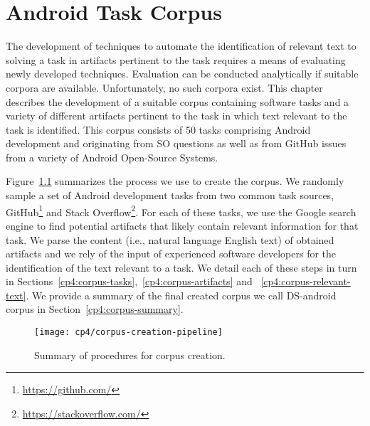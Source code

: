 \setcounter{chapter}{3}
\setcounter{rq}{1}


\chapter{Android Task Corpus}
\label{ch:android-corpus}





The development of techniques
to automate the identification of relevant text
to solving a task in artifacts
pertinent to the task requires a
means of evaluating newly developed
techniques. Evaluation can be conducted
analytically if suitable corpora are
available. Unfortunately, no such corpora
exist. This chapter describes the
development of a suitable corpus
containing
software tasks
and a variety of different artifacts pertinent
to the task in which text relevant to the
task is identified.
This corpus consists of 
50 tasks comprising Android development and originating from \acf{SO} questions
as well as from GitHub issues from a variety of Android Open-Source Systems.

Figure~\ref{fig:corpus-creation-pipeline}
summarizes the process we use to create the corpus.
We randomly sample a set of Android development tasks from two common
task sources, GitHub\footnote{\url{https://github.com/}} and Stack Overflow\footnote{\url{https://stackoverflow.com/}}.
For each of these tasks, we use the Google search engine to find potential artifacts that likely contain relevant
information for that task. 
We parse the content (i.e., natural language English text) of obtained artifacts 
and we rely of the input of experienced 
software developers for the identification of the text relevant to a task.
We detail each of these steps in turn in 
Sections~\ref{cp4:corpus-tasks},~\ref{cp4:corpus-artifacts} and ~\ref{cp4:corpus-relevant-text}.
We provide a summary of the final created corpus we call \acs{DS-android} corpus in Section~\ref{cp4:corpus-summary}.



\begin{figure}
    \centering
    \texttt{[image: cp4/corpus-creation-pipeline]}
    \caption{Summary of procedures for corpus creation. }
    \label{fig:corpus-creation-pipeline}
\end{figure}

\clearpage

















